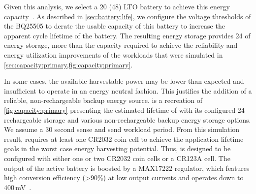 Given this analysis, we select a 20\ssi{\milli\Ah} (48\ssi{\milli\Wh}) LTO battery 
to achieve this energy capacity~\cite{LTODatasheet, LTODatasheet2}.
As described in \cref{sec:battery:life},
we configure the voltage thresholds of the BQ25505 to derate the 
usable capacity of this battery to  
increase the apparent cycle lifetime of the battery. 
The resulting energy storage provides 24\ssi{\milli\Wh} of
energy storage, more than the capacity required to achieve the reliability and energy utilization
improvements of the workloads that were simulated in \cref{sec:capacity:primary,fig:capacity:primary}.

In some cases, the available harvestable power may be lower than expected and insufficient to operate in an energy neutral fashion. 
This justifies the addition of a reliable, non-rechargeable backup energy source.
 is a recreation of \cref{fig:capacity:primary} presenting the estimated lifetime of \name with its configured 24\ssi{\micro\Wh} rechargeable storage and various non-rechargeable backup energy storage options. We assume a 30 second sense and send workload period.
From this simulation result, \name requires at least one CR2032 coin cell to achieve the application lifetime goals in the worst case energy harvesting potential.
Thus, \name is designed to be configured with either one or two CR2032 coin
cells or a CR123A cell. 
The output of the active battery
is boosted by a MAX17222 regulator, which features high conversion efficiency
(>90\%) at low output currents and operates down to 400\,mV~\cite{max17222}.

